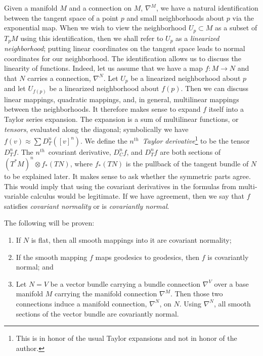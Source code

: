 \documentclass[11pt]{article}
\theoremstyle{remark}
\begin{document}
Given a manifold $M$ and a connection on $M$, $\nabla^M$, we
have a natural identification between the tangent space of a point $p$
and small neighborhoods about $p$ via the exponential map. 
When we wish to view the
neighborhood $U_p \subset M$ as a subset of $T_pM$  using this
identification, then we 
shall refer to  $U_p$ as a \emph{linearized neighborhood};
putting linear coordinates on the tangent space leads to normal
coordinates for our neighborhood. The
identification  allows us to discuss the linearity of
functions. Indeed, let us assume that we have a map $f: M \to N$ and
that $N$ carries a connection, $\nabla^N$. Let $U_p$ be a
linearized neighborhood about $p$ and let $U_{f(p)}$ be a linearized
neighborhood about 
$f(p)$. Then we can discuss linear mappings, quadratic mappings, and,
in general, multilinear mappings between the neighborhoods. It
therefore makes sense to expand $f$ itself into a Taylor series
expansion. The expansion is a sum of multilinear functions, or
\emph{tensors}, evaluated
along the diagonal;  symbolically  we have $f(v) \approx \sum D_T^n
([v]^n).$ We define the \emph{\ensuremath{{n}^{th}}\ Taylor
derivative}\footnote{This is in honor of the usual Taylor expansions
  and not in honor of the author.}
 to be the tensor $D_T^n f$. The \ensuremath{{n}^{th}}\ covariant derivative,
$D_C^n f$, and $D_T^n f $ are both sections of $(T^*M)^n\otimes f_{*}(TN)$,
where $f_* (TN)$ is the pullback of the tangent bundle of $N$ to be
explained later.  
It makes sense to ask whether the symmetric parts agree. This would
imply that using the covariant derivatives in the formulas from
multi-variable calculus would be legitimate. If we have agreement, 
then we say that $f$
satisfies \emph{covariant normality} or is \emph{covariantly normal}.


The following will be proven:  
\begin{enumerate}
\item If $N$ is flat, then all smooth mappings into it are
covariant normality; 
\item If the smooth mapping $f$ maps geodesics to
geodesics, then $f$ is covariantly normal; and
\item Let $N = V$ be a vector bundle
carrying a bundle connection $\nabla^{V}$ over a base manifold $M$ carrying the
manifold connection $\nabla^{M}$. Then those two connections induce a
manifold connection, $\nabla^{N}$, on $N$. Using $\nabla^{N}$, all
smooth sections
of the vector bundle are covariantly normal. 
\end{enumerate}
\end{document}
